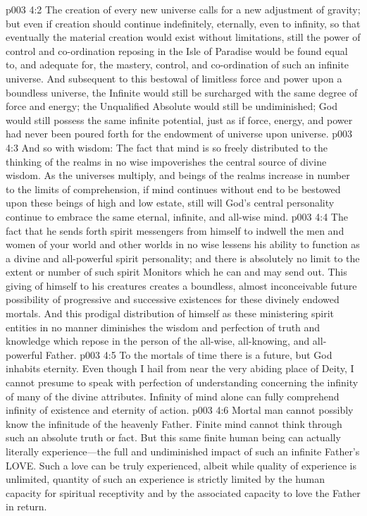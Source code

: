 \vs p003 4:2 The creation of every new universe calls for a new adjustment of gravity; but even if creation should continue indefinitely, eternally, even to infinity, so that eventually the material creation would exist without limitations, still the power of control and co\hyp{}ordination reposing in the Isle of Paradise would be found equal to, and adequate for, the mastery, control, and co\hyp{}ordination of such an infinite universe. And subsequent to this bestowal of limitless force and power upon a boundless universe, the Infinite would still be surcharged with the same degree of force and energy; the Unqualified Absolute would still be undiminished; God would still possess the same infinite potential, just as if force, energy, and power had never been poured forth for the endowment of universe upon universe.
\vs p003 4:3 And so with wisdom: The fact that mind is so freely distributed to the thinking of the realms in no wise impoverishes the central source of divine wisdom. As the universes multiply, and beings of the realms increase in number to the limits of comprehension, if mind continues without end to be bestowed upon these beings of high and low estate, still will God’s central personality continue to embrace the same eternal, infinite, and all\hyp{}wise mind.
\vs p003 4:4 The fact that he sends forth spirit messengers from himself to indwell the men and women of your world and other worlds in no wise lessens his ability to function as a divine and all\hyp{}powerful spirit personality; and there is absolutely no limit to the extent or number of such spirit Monitors which he can and may send out. This giving of himself to his creatures creates a boundless, almost inconceivable future possibility of progressive and successive existences for these divinely endowed mortals. And this prodigal distribution of himself as these ministering spirit entities in no manner diminishes the wisdom and perfection of truth and knowledge which repose in the person of the all\hyp{}wise, all\hyp{}knowing, and all\hyp{}powerful Father.
\pc \vs p003 4:5 To the mortals of time there is a future, but God inhabits eternity. Even though I hail from near the very abiding place of Deity, I cannot presume to speak with perfection of understanding concerning the infinity of many of the divine attributes. Infinity of mind alone can fully comprehend infinity of existence and eternity of action.
\pc \vs p003 4:6 Mortal man cannot possibly know the infinitude of the heavenly Father. Finite mind cannot think through such an absolute truth or fact. But this same finite human being can actually literally experience---the full and undiminished impact of such an infinite Father’s LOVE. Such a love can be truly experienced, albeit while quality of experience is unlimited, quantity of such an experience is strictly limited by the human capacity for spiritual receptivity and by the associated capacity to love the Father in return.\plusone

